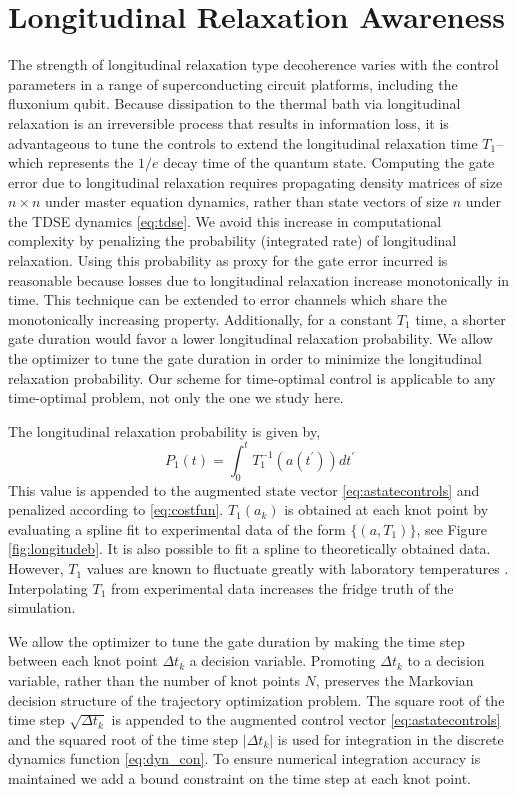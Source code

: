 \section{Longitudinal Relaxation Awareness \label{sec:longitude}}
The strength of longitudinal relaxation type decoherence varies
with the control parameters in a range of superconducting circuit platforms,
including the fluxonium qubit. Because dissipation to the thermal bath
via longitudinal relaxation is an irreversible process that results in information loss,
it is advantageous to tune the controls to extend the longitudinal
relaxation time $T_{1}$--which represents the $1/e$ decay time
of the quantum state.
Computing the gate error due to longitudinal relaxation
requires propagating density matrices of size $n \times n$ under master equation
dynamics, rather than state vectors of size $n$ under the TDSE dynamics \eqref{eq:tdse}.
We avoid this increase in computational complexity by
penalizing the probability (integrated rate) of longitudinal relaxation.
Using this probability as proxy for the gate error incurred
is reasonable because losses due to longitudinal relaxation increase monotonically
in time.
This technique can be extended to
error channels which share the monotonically increasing property.
Additionally, for a constant $T_{1}$ time, a shorter gate duration
would favor a lower longitudinal relaxation probability. We allow
the optimizer to tune the gate duration in order to minimize the
longitudinal relaxation probability. Our scheme for time-optimal
control is applicable to any time-optimal problem, not only
the one we study here.

The longitudinal relaxation probability is given by,
\begin{equation}
  P_{1}(t) = \int_{0}^{t} T_{1}^{-1}(a(t^{\prime})) dt^{\prime}
\end{equation}
This value is appended to the augmented state vector \eqref{eq:astatecontrols}
and penalized according to \eqref{eq:costfun}.
$T_{1}(a_{k})$ is obtained at each knot point by evaluating
a spline fit to experimental data of the form $\{(a, T_{1})\}$,
see Figure \ref{fig:longitudeb}.
It is also possible to fit a spline to theoretically obtained data.
However, $T_{1}$ values are known to fluctuate greatly
with laboratory temperatures \cite{klimov2018fluctuations}.
Interpolating $T_{1}$ from experimental data
increases the fridge truth of the simulation.

We allow the optimizer to tune the gate duration by
making the time step between each knot point $\Delta t_{k}$
a decision variable. Promoting $\Delta t_{k}$ to a decision variable, rather
than the number of knot points $N$, preserves the
Markovian decision structure of the trajectory
optimization problem. The square root of the time step $\sqrt{\Delta t_{k}}$
is appended to the augmented control vector \eqref{eq:astatecontrols}
and the squared root
of the time step $\lvert \Delta t_{k} \rvert$ is used
for integration in the discrete dynamics function \eqref{eq:dyn_con}.
To ensure numerical
integration accuracy is maintained we add a bound
constraint on the time step at each knot point.

